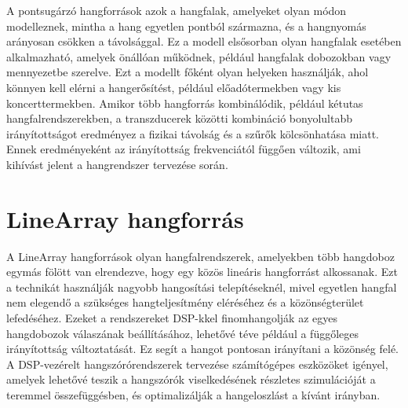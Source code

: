 A pontsugárzó hangforrások azok a hangfalak, amelyeket olyan módon modelleznek, mintha a hang egyetlen pontból származna, és a hangnyomás arányosan csökken a távolsággal. 
Ez a modell elsősorban olyan hangfalak esetében alkalmazható, amelyek önállóan működnek, például hangfalak dobozokban vagy mennyezetbe szerelve. 
Ezt a modellt főként olyan helyeken használják, ahol könnyen kell elérni a hangerősítést, például előadótermekben vagy kis koncerttermekben. 
Amikor több hangforrás kombinálódik, például kétutas hangfalrendszerekben, a transzducerek közötti kombináció bonyolultabb irányítottságot eredményez
a fizikai távolság és a szűrők kölcsönhatása miatt. 
Ennek eredményeként az irányítottság frekvenciától függően változik, ami kihívást jelent a hangrendszer tervezése során.

\section{LineArray hangforrás}

A LineArray hangforrások olyan hangfalrendszerek, amelyekben több hangdoboz egymás fölött van elrendezve, 
hogy egy közös lineáris hangforrást alkossanak. Ezt a technikát használják nagyobb hangosítási telepítéseknél, 
mivel egyetlen hangfal nem elegendő a szükséges hangteljesítmény eléréséhez és a közönségterület lefedéséhez. 
Ezeket a rendszereket DSP-kkel finomhangolják az egyes hangdobozok válaszának beállításához, lehetővé téve például
a függőleges irányítottság változtatását. Ez segít a hangot pontosan irányítani a közönség felé. 
A DSP-vezérelt hangszórórendszerek tervezése számítógépes eszközöket igényel, 
amelyek lehetővé teszik a hangszórók viselkedésének részletes szimulációját a teremmel összefüggésben, 
és optimalizálják a hangeloszlást a kívánt irányban.


